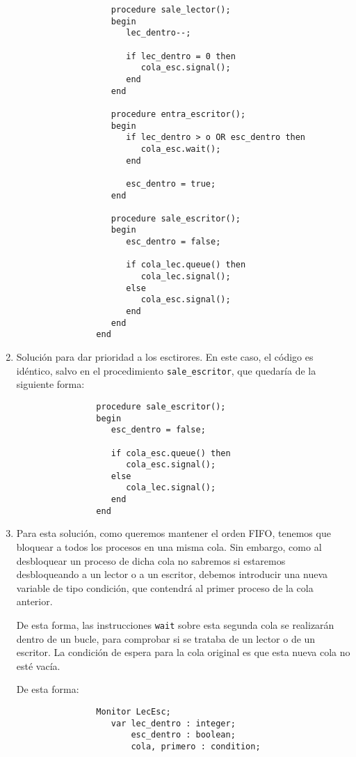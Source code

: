 \begin{ejercicio}
\begin{enumerate}
\begin{verbatim}
                   procedure sale_lector();
                   begin
                      lec_dentro--;

                      if lec_dentro = 0 then
                         cola_esc.signal();
                      end
                   end

                   procedure entra_escritor();
                   begin
                      if lec_dentro > o OR esc_dentro then
                         cola_esc.wait();
                      end

                      esc_dentro = true;
                   end

                   procedure sale_escritor();
                   begin
                      esc_dentro = false;

                      if cola_lec.queue() then
                         cola_lec.signal();
                      else
                         cola_esc.signal();
                      end
                   end
                end
            \end{verbatim}
        \item Solución para dar prioridad a los esctirores. En este caso, el código es idéntico, salvo en el procedimiento \verb|sale_escritor|, que quedaría de la siguiente forma:
            \begin{verbatim}
                procedure sale_escritor();
                begin
                   esc_dentro = false;

                   if cola_esc.queue() then
                      cola_esc.signal();
                   else
                      cola_lec.signal();
                   end
                end
            \end{verbatim}
        \item Para esta solución, como queremos mantener el orden FIFO, tenemos que bloquear a todos los procesos en una misma cola. Sin embargo, como al desbloquear un proceso de dicha cola no sabremos si estaremos desbloqueando a un lector o a un escritor, debemos introducir una nueva variable de tipo condición, que contendrá al primer proceso de la cola anterior.

            De esta forma, las instrucciones \verb|wait| sobre esta segunda cola se realizarán dentro de un bucle, para comprobar si se trataba de un lector o de un escritor. La condición de espera para la cola original es que esta nueva cola no esté vacía.

            De esta forma:
            \begin{verbatim}
                Monitor LecEsc;
                   var lec_dentro : integer;
                       esc_dentro : boolean;
                       cola, primero : condition;


\end{verbatim}
\end{enumerate}
\end{ejercicio}
